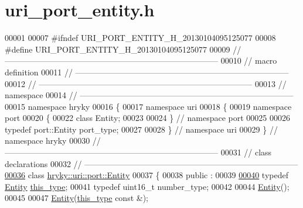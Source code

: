\hypertarget{uri__port__entity_8h_source}{\section{uri\-\_\-port\-\_\-entity.\-h}
}

\begin{DoxyCode}
00001 
00007 \textcolor{preprocessor}{#ifndef URI\_PORT\_ENTITY\_H\_20130104095125077}
00008 \textcolor{preprocessor}{}\textcolor{preprocessor}{#define URI\_PORT\_ENTITY\_H\_20130104095125077}
00009 \textcolor{preprocessor}{}\textcolor{comment}{//
      ------------------------------------------------------------------------------}
00010 \textcolor{comment}{// macro definition}
00011 \textcolor{comment}{//
      ------------------------------------------------------------------------------}
00012 \textcolor{comment}{//
      ------------------------------------------------------------------------------}
00013 \textcolor{comment}{// namespace}
00014 \textcolor{comment}{//
      ------------------------------------------------------------------------------}
00015 \textcolor{keyword}{namespace }hryky
00016 \{
00017 \textcolor{keyword}{namespace }uri
00018 \{
00019 \textcolor{keyword}{namespace }port
00020 \{
00022     \textcolor{keyword}{class }Entity;
00023 
00024 \} \textcolor{comment}{// namespace port}
00025 
00026 \textcolor{keyword}{typedef} port::Entity port\_type;
00027 
00028 \} \textcolor{comment}{// namespace uri}
00029 \} \textcolor{comment}{// namespace hryky}
00030 \textcolor{comment}{//
      ------------------------------------------------------------------------------}
00031 \textcolor{comment}{// class declarations}
00032 \textcolor{comment}{//
      ------------------------------------------------------------------------------}
\hypertarget{uri__port__entity_8h_source_l00036}{}\hyperlink{classhryky_1_1uri_1_1port_1_1_entity}{00036} \textcolor{comment}{}\textcolor{keyword}{class }\hyperlink{classhryky_1_1uri_1_1port_1_1_entity}{hryky::uri::port::Entity}
00037 \{
00038 \textcolor{keyword}{public} :
00039 
\hypertarget{uri__port__entity_8h_source_l00040}{}\hyperlink{classhryky_1_1uri_1_1port_1_1_entity_a5039b7839f1b865fba0d30d01eac50f5}{00040}     \textcolor{keyword}{typedef} \hyperlink{classhryky_1_1uri_1_1port_1_1_entity}{Entity} \hyperlink{classhryky_1_1uri_1_1port_1_1_entity_a5039b7839f1b865fba0d30d01eac50f5}{this_type};
00041     \textcolor{keyword}{typedef} uint16\_t number\_type;
00042 
00044     \hyperlink{classhryky_1_1uri_1_1port_1_1_entity_ae2e3ee42bba9f775c59dccfcbfcd7aec}{Entity}();
00045 
00047     \hyperlink{classhryky_1_1uri_1_1port_1_1_entity_ae2e3ee42bba9f775c59dccfcbfcd7aec}{Entity}(\hyperlink{classhryky_1_1uri_1_1port_1_1_entity}{this_type} \textcolor{keyword}{const} &);

\end{DoxyCode}

